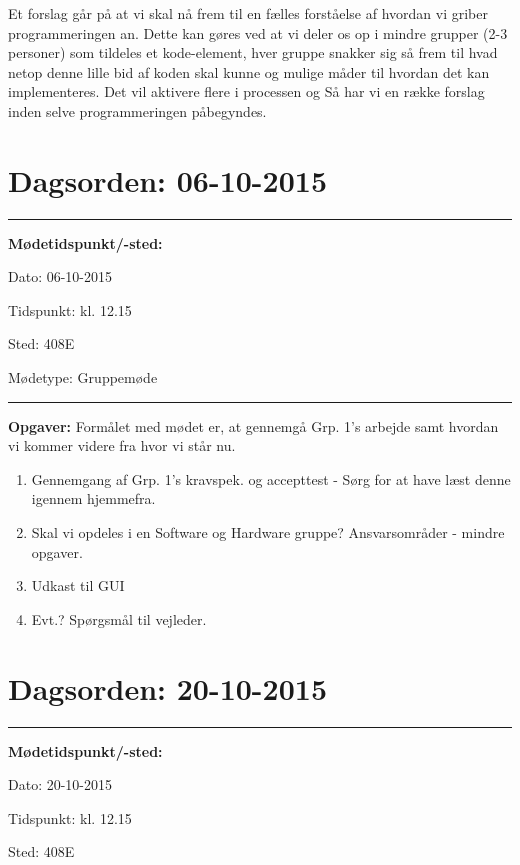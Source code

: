 Et forslag går på at vi skal nå frem til en fælles forståelse af hvordan vi griber programmeringen an. Dette kan gøres ved at vi deler os op i mindre grupper (2-3 personer) som tildeles et kode-element, hver gruppe snakker sig så frem til hvad netop denne lille bid af koden skal kunne  og mulige måder til hvordan det kan implementeres. Det vil aktivere flere i processen og Så har vi en række forslag inden selve programmeringen påbegyndes.

\newpage
\section{Dagsorden: 06-10-2015}
\hrule



\textbf{Mødetidspunkt/-sted:} 

Dato: \tabto{7em} 06-10-2015

Tidspunkt: \tabto{7em} kl. 12.15

Sted: \tabto{7em} 408E

Mødetype: \tabto{7em} Gruppemøde \newline


\hrule
\textbf{Opgaver:} \newline
Formålet med mødet er, at gennemgå Grp. 1's arbejde samt hvordan vi kommer videre fra hvor vi står nu.
\begin{enumerate}
\item Gennemgang af Grp. 1's kravspek. og accepttest - Sørg for at have læst denne igennem hjemmefra.

\item Skal vi opdeles i en Software og Hardware gruppe? Ansvarsområder - mindre opgaver.

\item Udkast til GUI

\item Evt.? Spørgsmål til vejleder.
\end{enumerate}

\newpage
\section{Dagsorden: 20-10-2015}
\hrule



\textbf{Mødetidspunkt/-sted:} 

Dato: \tabto{7em} 20-10-2015

Tidspunkt: \tabto{7em} kl. 12.15

Sted: \tabto{7em} 408E

